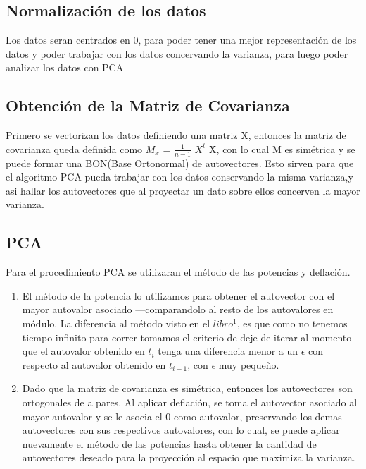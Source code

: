 \subsection{Normalización de los datos}
Los datos seran centrados en 0, para poder tener una mejor representación de los
datos y poder trabajar con los datos concervando la varianza, para luego poder analizar
los datos con PCA

\subsection{Obtención de la Matriz de Covarianza}
Primero se vectorizan los datos definiendo una matriz X, entonces la matriz de covarianza queda definida como $M_{x}$ = $\frac{1}{n-1}$ $X^{t}$ X, con lo cual M es simétrica y se puede formar una BON(Base Ortonormal) de autovectores. Esto sirven para que el algoritmo PCA pueda trabajar con los datos conservando la misma varianza,y asi hallar los autovectores que al proyectar un dato sobre ellos concerven la mayor varianza.

\subsection{PCA}
Para el procedimiento PCA se utilizaran el método de las potencias y deflación. 
\begin{enumerate}
\item El método de la potencia lo utilizamos para obtener el autovector con el mayor autovalor asociado ---comparandolo al resto de los autovalores en módulo. La diferencia al método visto en el $libro^{1}$, es que como no tenemos tiempo infinito para correr tomamos el criterio de deje de iterar al momento que el autovalor obtenido en $t_{i}$ tenga una diferencia menor a un $\epsilon$ con respecto al autovalor obtenido en $t_{i-1}$, con $\epsilon$ muy pequeño.
\item Dado que la matriz de covarianza es simétrica, entonces los autovectores son ortogonales de a pares. Al aplicar deflación, se toma el autovector asociado al mayor autovalor y se le asocia el 0 como autovalor, preservando los demas autovectores con sus respectivos autovalores, con lo cual, se puede aplicar nuevamente el método de las potencias hasta obtener la cantidad de autovectores deseado para la proyección al espacio que maximiza la varianza.

\end{enumerate}


